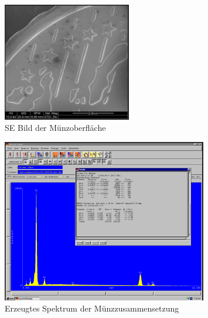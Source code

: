 \documentclass[12pt,english,ngerman]{scrartcl}
\begin{document}
\begin{figure}[H]
	\begin{center}
		\includegraphics[width =0.5\textwidth]{./figures/munze.png}
	\end{center}
	\caption{SE Bild der Münzoberfläche \cite{sein_foto}}
    \label{fig:munze}
\end{figure}

\begin{figure}[H]
	\begin{center}
		\includegraphics[width =0.8\textwidth]{./figures/qualitativ1.png}
	\end{center}
	\caption{Erzeugtes Spektrum der Münzzusammensetzung \cite{sein_foto}}
    \label{fig:qualitativ1}
\end{figure}
\end{document}
